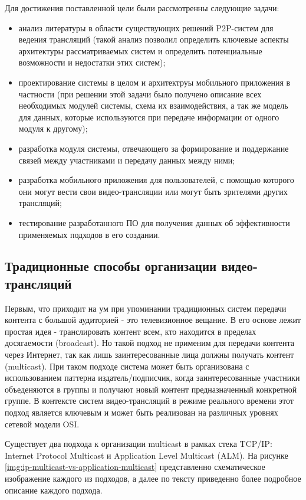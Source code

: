 	Для достижения поставленной цели были рассмотренны следующие задачи:
	\begin{itemize}
		\item анализ литературы в области существующих решений P2P-систем для ведения трансляций (такой анализ позволил
		определить ключевые аспекты архитектуры рассматриваемых систем и определить потенциальные возможности и
		недостатки этих систем);
		\item проектирование системы в целом и архитектруы мобильного приложения в частности (при решении этой задачи
		было получено описание всех необходимых модулей системы, схема их взаимодействия, а так же модель для данных,
		которые используются при передаче информации от одного модуля к другому);
		\item разработка модуля системы, отвечающего за формирование и поддержание связей между участниками и передачу
		данных между ними;
		\item разработка мобильного приложения для пользователей, с помощью которого они могут вести свои
		видео-трансляции или могут быть зрителями других трансляций;
		\item тестирование разработанного ПО для получения данных об эффективности применяемых подходов в его создании.
	\end{itemize}

	\subsection{Традиционные способы организации видео-трансляций}
	Первым, что приходит на ум при упоминании традиционных систем передачи контента с большой аудиторией - это
	телевизионное вещание. В его основе лежит простая идея - транслировать контент всем, кто находится в пределах
	досягаемости (broadcast). Но такой подход не применим для передачи контента через Интернет, так как лишь
	заинтересованные лица должны получать контент (multicast). При таком подходе система может быть
	организована с использованием паттерна издатель/подписчик, когда заинтересованные участники объеденяются в группы и
	получают новый контент предназначенный конкретной группе. В контексте систем видео-трансляций в режиме реального
	времени этот подход является ключевым и может быть реализован на различных уровнях сетевой модели OSI.

	Существует два подхода к организации multicast в рамках стека TCP/IP: Internet Protocol Multicast \cite{rfc791} и Application
	Level Multicast (ALM). На рисунке \ref{img:ip-multicast-vs-application-multicast} представленно схематическое
	изображение каждого из подходов, а далее по тексту приведенно более подробное описание каждого подхода.

